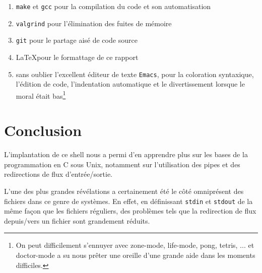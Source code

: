 \documentclass{article}
\begin{document}
\begin{enumerate}
\item \texttt{make} et \texttt{gcc} pour la compilation du code et son automatisation
\item \texttt{valgrind} pour l'élimination des fuites de mémoire
\item \texttt{git} pour le partage aisé de code source
\item \LaTeX pour le formattage de ce rapport
\item sans oublier l'excellent éditeur de texte \texttt{Emacs}, pour la coloration syntaxique, l'édition de code, l'indentation automatique et le divertissement lorsque le moral était bas\footnote{On peut difficilement s'ennuyer avec zone-mode, life-mode, pong, tetris, ... et doctor-mode a su nous prêter une oreille d'une grande aide dans les moments difficiles.}
\end{enumerate}

\section{Conclusion}

L'implantation de ce shell nous a permi d'en apprendre plus sur les bases de la programmation en C sous Unix, notamment sur l'utilisation des pipes et des redirections de flux d'entrée/sortie.

L'une des plus grandes révélations a certainement été le côté omniprésent des fichiers dans ce genre de systèmes. En effet, en définissant \texttt{stdin} et \texttt{stdout} de la même façon que les fichiers réguliers, des problèmes tels que la redirection de flux depuis/vers un fichier sont grandement réduits.
\end{document}
